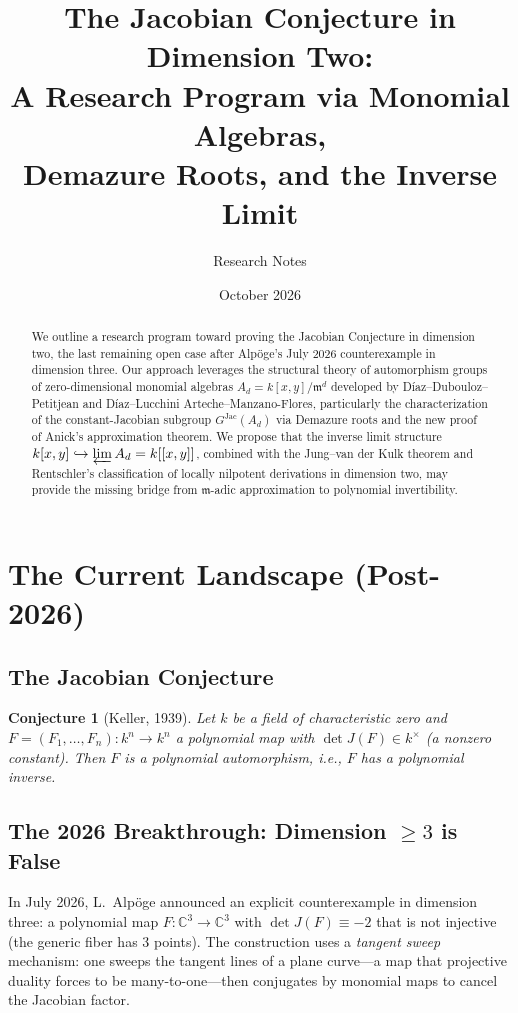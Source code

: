 \documentclass[12pt,a4paper]{article}
\title{The Jacobian Conjecture in Dimension Two:\\
A Research Program via Monomial Algebras,\\
Demazure Roots, and the Inverse Limit}
\author{Research Notes}
\date{October 2026}
\newtheorem{conjecture}[theorem]{Conjecture}
\theoremstyle{definition}
\newcommand{\CC}{\mathbb{C}}
\newcommand{\kk}{k}
\newcommand{\pp}{\mathfrak{m}}
\newcommand{\GJac}{G^{\mathrm{Jac}}}
\begin{document}
\maketitle

\begin{abstract}
We outline a research program toward proving the Jacobian Conjecture in dimension two,
the last remaining open case after Alp\"oge's July 2026 counterexample in dimension three.
Our approach leverages the structural theory of automorphism groups of zero-dimensional
monomial algebras $A_d = \kk[x,y]/\pp^d$ developed by D\'iaz--Dubouloz--Petitjean and
D\'iaz--Lucchini Arteche--Manzano-Flores, particularly the characterization of the
constant-Jacobian subgroup $\GJac(A_d)$ via Demazure roots and the new proof of Anick's
approximation theorem. We propose that the inverse limit structure
$\kk[x,y] \hookrightarrow \varprojlim A_d = \kk[[x,y]]$, combined with the
Jung--van der Kulk theorem and Rentschler's classification of locally nilpotent
derivations in dimension two, may provide the missing bridge from $\pp$-adic approximation
to polynomial invertibility.
\end{abstract}

\tableofcontents

\section{The Current Landscape (Post-2026)}

\subsection{The Jacobian Conjecture}

\begin{conjecture}[Keller, 1939]
Let $\kk$ be a field of characteristic zero and $F = (F_1,\ldots,F_n): \kk^n \to \kk^n$
a polynomial map with $\det J(F) \in \kk^{\times}$ (a nonzero constant). Then $F$ is a
polynomial automorphism, i.e., $F$ has a polynomial inverse.
\end{conjecture}

\subsection{The 2026 Breakthrough: Dimension $\geq 3$ is False}

In July 2026, L.~Alp\"oge announced an explicit counterexample in dimension three:
a polynomial map $F: \CC^3 \to \CC^3$ with $\det J(F) \equiv -2$ that is not injective
(the generic fiber has 3 points). The construction uses a \emph{tangent sweep} mechanism:
one sweeps the tangent lines of a plane curve---a map that projective duality forces to be
many-to-one---then conjugates by monomial maps to cancel the Jacobian factor.
\end{document}
